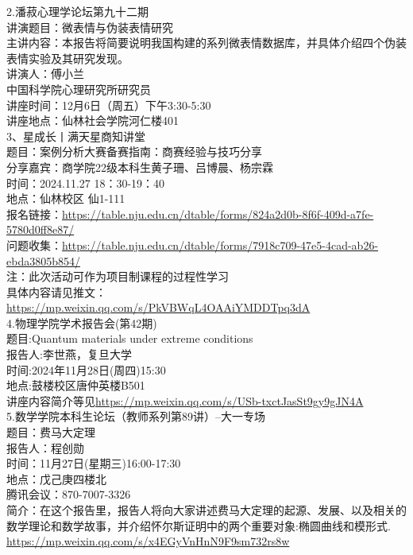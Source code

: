 \documentclass[letterpaper, 12pt]{article}
\begin{document}
\begin{multicols}{2}
2.潘菽心理学论坛第九十二期\\
讲演题目：微表情与伪装表情研究\\
主讲内容：本报告将简要说明我国构建的系列微表情数据库，并具体介绍四个伪装表情实验及其研究发现。\\
讲演人：傅小兰\\
中国科学院心理研究所研究员\\
讲座时间：12月6日（周五）下午3:30-5:30\\
讲座地点：仙林社会学院河仁楼401\\

3、星成长丨满天星商知讲堂\\
题目：案例分析大赛备赛指南：商赛经验与技巧分享\\
分享嘉宾：商学院22级本科生黄子珊、吕博晨、杨宗霖\\
时间：2024.11.27 18：30-19：40\\
地点：仙林校区 仙1-111\\
报名链接：\url{https://table.nju.edu.cn/dtable/forms/824a2d0b-8f6f-409d-a7fe-5780d0ff8e87/}\\
问题收集：\url{https://table.nju.edu.cn/dtable/forms/7918c709-47e5-4cad-ab26-ebda3805b854/}\\
注：此次活动可作为项目制课程的过程性学习\\
具体内容请见推文：\url{https://mp.weixin.qq.com/s/PkVBWqL4OAAiYMDDTpq3dA}\\

4.物理学院学术报告会(第42期)\\
题目:Quantum materials under extreme conditions\\
报告人:李世燕，复旦大学\\
时间:2024年11月28日(周四)15:30\\
地点:鼓楼校区唐仲英楼B501\\
讲座内容简介等见\url{https://mp.weixin.qq.com/s/USb-txctJasSt9gy9gJN4A}\\

5.数学学院本科生论坛（教师系列第89讲）--大一专场\\
题目：费马大定理\\
报告人：程创勋\\
时间：11月27日(星期三)16:00-17:30\\
地点：戊己庚四楼北\\
腾讯会议：870-7007-3326\\
简介：在这个报告里，报告人将向大家讲述费马大定理的起源、发展、以及相关的数学理论和数学故事，并介绍怀尔斯证明中的两个重要对象:椭圆曲线和模形式.\\
\url{https://mp.weixin.qq.com/s/x4EGyVnHnN9F9sm732rs8w}\\



\end{multicols}
\end{document}
